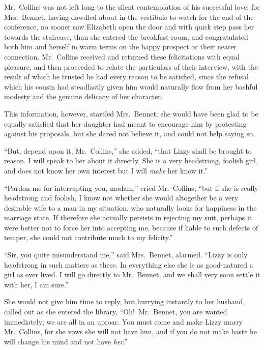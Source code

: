 \documentclass[12pt,english,oneside]{book}
\begin{document}


Mr.\ Collins was not left long to the silent contemplation of his
successful love; for Mrs.\ Bennet, having dawdled about in the vestibule
to watch for the end of the conference, no sooner saw Elizabeth open
the door and with quick step pass her towards the staircase, than
she entered the breakfast-room, and congratulated both him and herself
in warm terms on the happy prospect or their nearer connection. Mr.\ Collins
received and returned these felicitations with equal pleasure, and
then proceeded to relate the particulars of their interview, with
the result of which he trusted he had every reason to be satisfied,
since the refusal which his cousin had steadfastly given him would
naturally flow from her bashful modesty and the genuine delicacy of
her character.

This information, however, startled Mrs.\ Bennet; she would have
been glad to be equally satisfied that her daughter had meant to encourage
him by protesting against his proposals, but she dared not believe
it, and could not help saying so.

{}``But, depend upon it, Mr.\ Collins,'' she added, {}``that Lizzy
shall be brought to reason. I will speak to her about it directly.
She is a very headstrong, foolish girl, and does not know her own
interest but I will \textit{make} her know it.''

{}``Pardon me for interrupting you, madam,'' cried Mr.\ Collins;
{}``but if she is really headstrong and foolish, I know not whether
she would altogether be a very desirable wife to a man in my situation,
who naturally looks for happiness in the marriage state. If therefore
she actually persists in rejecting my suit, perhaps it were better
not to force her into accepting me, because if liable to such defects
of temper, she could not contribute much to my felicity.''

{}``Sir, you quite misunderstand me,'' said Mrs.\ Bennet, alarmed.
{}``Lizzy is only headstrong in such matters as these. In everything
else she is as good-natured a girl as ever lived. I will go directly
to Mr.\ Bennet, and we shall very soon settle it with her, I am sure.''

She would not give him time to reply, but hurrying instantly to her
husband, called out as she entered the library, {}``Oh!\ Mr.\ Bennet,
you are wanted immediately; we are all in an uproar. You must come
and make Lizzy marry Mr.\ Collins, for she vows she will not have
him, and if you do not make haste he will change his mind and not
have \textit{her}.''
\end{document}
